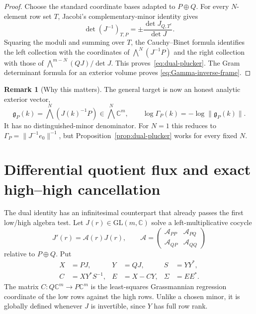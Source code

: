 \documentclass[11pt]{article}
\newcommand{\C}{\mathbb C}
\theoremstyle{definition}
\newtheorem{remark}[proposition]{Remark}
\begin{document}
\begin{proof}
Choose the standard coordinate bases adapted to $P\oplus Q$.  For every
$N$-element row set $T$, Jacobi's complementary-minor identity gives
\begin{equation}
 \det (J^{-1})_{T,P}
 =\pm\frac{\det J_{Q,T^c}}{\det J}.
 \label{eq:jacobi-complement}
\end{equation}
Squaring the moduli and summing over $T$, the Cauchy--Binet formula identifies
the left collection with the coordinates of
$\bigwedge^N(J^{-1}P)$ and the right collection with those of
$\bigwedge^{m-N}(QJ)/\det J$.  This proves~\eqref{eq:dual-plucker}.
The Gram determinant formula for an exterior volume proves
\eqref{eq:Gamma-inverse-frame}.
\end{proof}

\begin{remark}[Why this matters]
The general target is now an honest analytic exterior vector,
\begin{equation}
 \mathfrak g_P(k)=\bigwedge^N\!\left(J(k)^{-1}P\right)
 \in\bigwedge^N\C^m,
 \qquad
 \log\Gamma_P(k)=-\log\|\mathfrak g_P(k)\|.
 \label{eq:dual-exterior-vector}
\end{equation}
It has no distinguished-minor denominator.  For $N=1$ this reduces to
$\Gamma_P=\|J^{-1}e_0\|^{-1}$, but
Proposition~\ref{prop:dual-plucker} works for every fixed $N$.
\end{remark}

\section{Differential quotient flux and exact high--high cancellation}

The dual identity has an infinitesimal counterpart that already passes the
first low/high algebra test.  Let $J(r)\in\mathrm{GL}(m,\C)$ solve a
left-multiplicative cocycle
\begin{equation}
 J'(r)=\mathcal A(r)J(r),
 \qquad
 \mathcal A=
 \begin{pmatrix}
  \mathcal A_{PP}&\mathcal A_{PQ}\\
  \mathcal A_{QP}&\mathcal A_{QQ}
 \end{pmatrix}
 \label{eq:left-cocycle}
\end{equation}
relative to $P\oplus Q$.  Put
\begin{align}
 X&=PJ,&Y&=QJ,&S&=YY^*,
 \label{eq:XY}\\
 C&=XY^*S^{-1},&E&=X-CY,&\Sigma&=EE^*.
 \label{eq:regression-frame}
\end{align}
The matrix $C:Q\C^m\to P\C^m$ is the least-squares Grassmannian regression
coordinate of the low rows against the high rows.  Unlike a chosen minor, it
is globally defined whenever $J$ is invertible, since $Y$ has full row rank.
\end{document}
